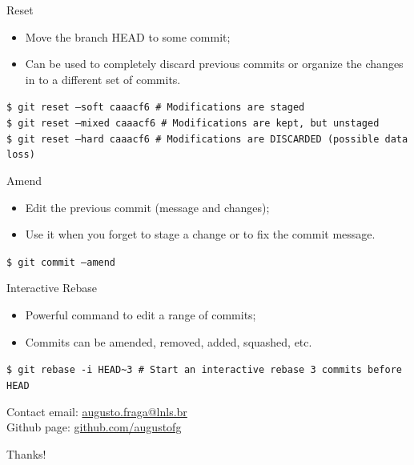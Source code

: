 \documentclass{beamer}
\begin{document}
\begin{frame}{Reset}
  \begin{itemize}
    \item Move the branch HEAD to some commit;
    \item Can be used to completely discard previous commits or organize the changes in to a different set of commits.
  \end{itemize}
  \begin{block}{}
    \texttt{\$ git reset --soft caaacf6 \# Modifications are staged} \\
    \texttt{\$ git reset --mixed caaacf6 \# Modifications are kept, but unstaged} \\
    \texttt{\$ git reset --hard caaacf6 \# Modifications are DISCARDED (possible data loss)}
  \end{block}
\end{frame}

\begin{frame}{Amend}
  \begin{itemize}
    \item Edit the previous commit (message and changes);
    \item Use it when you forget to stage a change or to fix the commit message.
  \end{itemize}
  \begin{block}{}
    \texttt{\$ git commit --amend}
  \end{block}
\end{frame}

\begin{frame}{Interactive Rebase}
  \begin{itemize}
    \item Powerful command to edit a range of commits;
    \item Commits can be amended, removed, added, squashed, etc.
  \end{itemize}
  \begin{block}{}
    \texttt{\$ git rebase -i HEAD\textasciitilde{}3 \# Start an interactive rebase 3 commits before HEAD}
  \end{block}
\end{frame}

\begin{frame}{Contact}
  email: \href{mailto:augusto.fraga@lnls.br}{augusto.fraga@lnls.br} \\
  Github page: \url{github.com/augustofg} \\
  \begin{center}
    Thanks!
  \end{center}
\end{frame}
\end{document}
